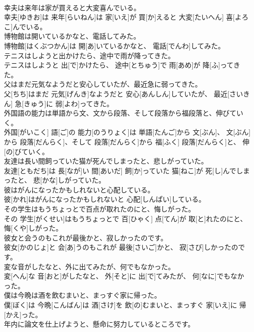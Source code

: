 \documentclass[8pt]{extreport}
\begin{document}
\begin{CJK}{UTF8}{min}
\\	幸夫は来年は家が買えると大変喜んでいる。	
\\	幸夫[ゆきお]は 来年[らいねん]は 家[いえ]が 買[か]えると 大変[たいへん] 喜[よろこ]んでいる。
\\	博物館は開いているかなと、電話してみた。	
\\	博物館[はくぶつかん]は 開[あ]いているかなと、 電話[でんわ]してみた。
\\	テニスはしようと出かけたら、途中で雨が降ってきた。	
\\	テニスはしようと 出[で]かけたら、 途中[とちゅう]で 雨[あめ]が 降[ふ]ってきた。
\\	父はまだ元気なようだと安心していたが、最近急に弱ってきた。	
\\	父[ちち]はまだ 元気[げんき]なようだと 安心[あんしん]していたが、 最近[さいきん] 急[きゅう]に 弱[よわ]ってきた。
\\	外国語の能力は単語から文、文から段落、そして段落から福段落と、伸びていく。	
\\	外国[がいこく] 語[ご]の 能力[のうりょく]は 単語[たんご]から 文[ぶん]、 文[ぶん]から 段落[だんらく]、そして 段落[だんらく]から 福[ふく] 段落[だんらく]と、 伸[の]びていく。
\\	友達は長い間飼っていた猫が死んでしまったと、悲しがっていた。	
\\	友達[ともだち]は 長[なが]い 間[あいだ] 飼[か]っていた 猫[ねこ]が 死[し]んでしまったと、 悲[かな]しがっていた。
\\	彼はがんになったかもしれないと心配している。	
\\	彼[かれ]はがんになったかもしれないと 心配[しんぱい]している。
\\	その学生はもうちょっとで百点が取れたのにと、悔しがった。	
\\	その 学生[がくせい]はもうちょっとで 百[ひゃく] 点[てん]が 取[と]れたのにと、 悔[くや]しがった。
\\	彼女と会うのもこれが最後かと、寂しかったのです。	
\\	彼女[かのじょ]と 会[あ]うのもこれが 最後[さいご]かと、 寂[さび]しかったのです。
\\	変な音がしたなと、外に出てみたが、何でもなかった。	
\\	変[へん]な 音[おと]がしたなと、 外[そと]に 出[で]てみたが、 何[なに]でもなかった。
\\	僕は今晩は酒を飲むまいと、まっすぐ家に帰った。	
\\	僕[ぼく]は 今晩[こんばん]は 酒[さけ]を 飲[の]むまいと、まっすぐ 家[いえ]に 帰[かえ]った。
\\	年内に論文を仕上げようと、懸命に努力しているところです。	

\end{CJK}
\end{document}
